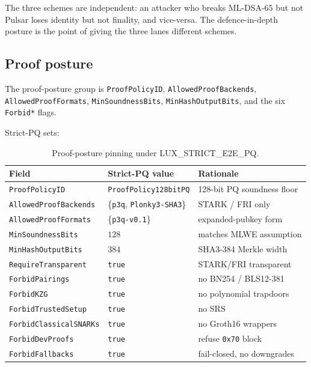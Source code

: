 The three schemes are independent: an attacker who breaks ML-DSA-65 but not
Pulsar loses identity but not finality, and vice-versa. The defence-in-depth
posture is the point of giving the three lanes different schemes.

\subsection{Proof posture}

The proof-posture group is \texttt{ProofPolicyID}, \texttt{AllowedProofBackends},
\texttt{AllowedProofFormats}, \texttt{MinSoundnessBits},
\texttt{MinHashOutputBits}, and the six \texttt{Forbid*} flags.

Strict-PQ sets:

\begin{table}[H]
\centering
\caption{Proof-posture pinning under LUX\_STRICT\_E2E\_PQ.}
\label{tab:proof-posture}
\begin{tabular}{lll}
\toprule
Field & Strict-PQ value & Rationale \\
\midrule
\texttt{ProofPolicyID}   & \texttt{ProofPolicy128bitPQ}    & 128-bit PQ soundness floor \\
\texttt{AllowedProofBackends} & \{\texttt{p3q}, \texttt{Plonky3-SHA3}\} & STARK / FRI only \\
\texttt{AllowedProofFormats}  & \{\texttt{p3q-v0.1}\}      & expanded-pubkey form \\
\texttt{MinSoundnessBits}     & $128$                       & matches MLWE assumption \\
\texttt{MinHashOutputBits}    & $384$                       & SHA3-384 Merkle width \\
\texttt{RequireTransparent}   & \texttt{true}               & STARK/FRI transparent \\
\texttt{ForbidPairings}       & \texttt{true}               & no BN254 / BLS12-381 \\
\texttt{ForbidKZG}            & \texttt{true}               & no polynomial trapdoors \\
\texttt{ForbidTrustedSetup}   & \texttt{true}               & no SRS \\
\texttt{ForbidClassicalSNARKs}& \texttt{true}               & no Groth16 wrappers \\
\texttt{ForbidDevProofs}      & \texttt{true}               & refuse \texttt{0x70} block \\
\texttt{ForbidFallbacks}      & \texttt{true}               & fail-closed, no downgrades \\
\bottomrule
\end{tabular}
\end{table}

